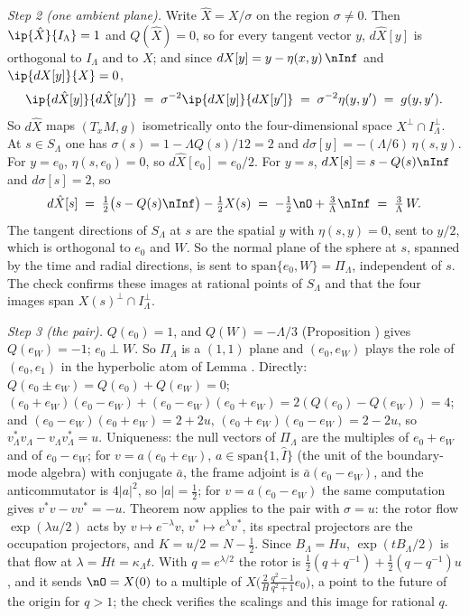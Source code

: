 \emph{Step 2 (one ambient plane).} Write $\hat X = X/\sigma$ on the region $\sigma \neq 0$. Then $\ip{\hat X}{I_{\Lambda}} = 1$ and $Q(\hat X) = 0$, so for every tangent vector $y$, $d\hat X[y]$ is orthogonal to $I_{\Lambda}$ and to $X$; and since $dX[y] = y - \eta(x,y)\,\nInf$ and $\ip{dX[y]}{X} = 0$,
\[
\ip{d\hat X[y]}{d\hat X[y']} \;=\; \sigma^{-2}\ip{dX[y]}{dX[y']} \;=\; \sigma^{-2}\eta(y, y') \;=\; g(y, y').
\]
So $d\hat X$ maps $(T_{x}M, g)$ isometrically onto the four-dimensional space $X^{\perp} \cap I_{\Lambda}^{\perp}$. At $s \in S_{\Lambda}$ one has $\sigma(s) = 1 - \Lambda Q(s)/12 = 2$ and $d\sigma[y] = -(\Lambda/6)\,\eta(s, y)$. For $y = e_{0}$, $\eta(s, e_{0}) = 0$, so $d\hat X[e_{0}] = e_{0}/2$. For $y = s$, $dX[s] = s - Q(s)\nInf$ and $d\sigma[s] = 2$, so
\[
d\hat X[s] \;=\; \tfrac12\bigl(s - Q(s)\nInf\bigr) - \tfrac12 X(s) \;=\; -\tfrac12\nO + \tfrac{3}{\Lambda}\nInf \;=\; \tfrac{3}{\Lambda}\,W .
\]
The tangent directions of $S_{\Lambda}$ at $s$ are the spatial $y$ with $\eta(s, y) = 0$, sent to $y/2$, which is orthogonal to $e_{0}$ and $W$. So the normal plane of the sphere at $s$, spanned by the time and radial directions, is sent to $\mathrm{span}\{e_{0}, W\} = \Pi_{\Lambda}$, independent of $s$. The check confirms these images at rational points of $S_{\Lambda}$ and that the four images span $X(s)^{\perp} \cap I_{\Lambda}^{\perp}$.

\emph{Step 3 (the pair).} $Q(e_{0}) = 1$, and $Q(W) = -\Lambda/3$ (Proposition ) gives $Q(e_{W}) = -1$; $e_{0} \perp W$. So $\Pi_{\Lambda}$ is a $(1,1)$ plane and $(e_{0}, e_{W})$ plays the role of $(e_{0}, e_{1})$ in the hyperbolic atom of Lemma . Directly: $Q(e_{0} \pm e_{W}) = Q(e_{0}) + Q(e_{W}) = 0$; $(e_{0} + e_{W})(e_{0} - e_{W}) + (e_{0} - e_{W})(e_{0} + e_{W}) = 2(Q(e_{0}) - Q(e_{W})) = 4$; and $(e_{0} - e_{W})(e_{0} + e_{W}) = 2 + 2u$, $(e_{0} + e_{W})(e_{0} - e_{W}) = 2 - 2u$, so $v_{\Lambda}^{*}v_{\Lambda} - v_{\Lambda}v_{\Lambda}^{*} = u$. Uniqueness: the null vectors of $\Pi_{\Lambda}$ are the multiples of $e_{0} + e_{W}$ and of $e_{0} - e_{W}$; for $v = a(e_{0} + e_{W})$, $a \in \mathrm{span}\{1, \hat{I}\}$ (the unit of the boundary-mode algebra) with conjugate $\bar a$, the frame adjoint is $\bar a(e_{0} - e_{W})$, and the anticommutator is $4|a|^{2}$, so $|a| = \tfrac12$; for $v = a(e_{0} - e_{W})$ the same computation gives $v^{*}v - vv^{*} = -u$. Theorem  now applies to the pair with $\sigma = u$: the rotor flow $\exp(\lambda u/2)$ acts by $v \mapsto e^{-\lambda}v$, $v^{*} \mapsto e^{\lambda}v^{*}$, its spectral projectors are the occupation projectors, and $K = u/2 = N - \tfrac12$. Since $B_{\Lambda} = Hu$, $\exp(tB_{\Lambda}/2)$ is that flow at $\lambda = Ht = \kappa_{\Lambda}t$. With $q = e^{\lambda/2}$ the rotor is $\tfrac12(q + q^{-1}) + \tfrac12(q - q^{-1})u$, and it sends $\nO = X(0)$ to a multiple of $X\bigl(\tfrac{2}{H}\tfrac{q^{2} - 1}{q^{2} + 1}e_{0}\bigr)$, a point to the future of the origin for $q > 1$; the check verifies the scalings and this image for rational $q$.

